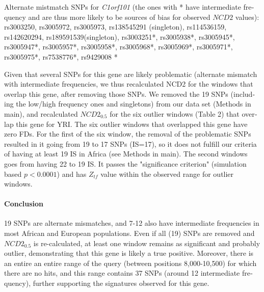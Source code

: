 \begin{refsection}
\begin{otherlanguage}{english}
\begin{footnotesize}
Alternate mistmatch SNPs for \emph{C1orf101} (the ones with * have intermediate frequency and are thus more likely to be sources of bias for observed $NCD2$ values):
rs3003250, rs3005972, rs3005973, rs138545291 (singleton), rs114536159, rs142620294, rs189591539(singleton), rs3003251*, rs3005938*, rs3005945*, rs3005947*, rs3005957*, rs3005958*, rs3005968*, rs3005969*, rs3005971*, rs3005975*, rs7538776*, rs9429008 *

Given that several SNPs for this gene are likely problematic (alternate mismatch with intermediate frequencies, we thus recalculated NCD2 for the windows that overlap this gene, after removing those SNPs. We removed the 19 SNPs (including the low/high frequency ones and singletons) from our data set (Methods in main), and recalculated $NCD2_{0.5}$ for the six outlier windows (Table 2) that overlap this gene for YRI. The six outlier windows that overlapped this gene have zero FDs. For the first of the six window, the removal of the problematic SNPs resulted in it going from 19 to 17 SNPs (IS=17), so it does not fulfill our criteria of having at least 19 IS in Africa (see Methods in main). The second windows goes from having 22 to 19 IS. It passes the "significance criterion" (simulation based $p<0.0001$) and has $Z_{tf}$ value within the observed range for outlier windows. 

\paragraph{Conclusion} 19 SNPs are alternate mismatches, and 7-12 also have intermediate frequencies in most African and European populations. Even if all (19) SNPs are removed and $NCD2_{0.5}$ is re-calculated, at least one window remains as significant and probably outlier, demonstrating that this gene is likely a true positive. Moreover, there is an entire an entire range of the query (between positions 8,000-10,500) for which there are no hits, and this range contains 37 SNPs (around 12 intermediate frequency), further supporting the signatures observed for this gene. 

\end{footnotesize}

\end{otherlanguage}
\end{refsection}

